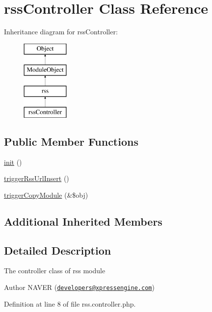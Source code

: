 \hypertarget{classrssController}{}\section{rss\+Controller Class Reference}
\label{classrssController}
Inheritance diagram for rss\+Controller\+:\begin{figure}[H]
\begin{center}
\leavevmode
\includegraphics[height=4.000000cm]{classrssController}
\end{center}
\end{figure}
\subsection*{Public Member Functions}
\begin{DoxyCompactItemize}
\item 
\hyperlink{classrssController_ab492c2ecc29016a37dcb049f318a176b}{init} ()
\item 
\hyperlink{classrssController_a95c7672a5f1e362b368bec030577f33e}{trigger\+Rss\+Url\+Insert} ()
\item 
\hyperlink{classrssController_a4c6d4fe22c2f2abeabe6a1231a63fa8b}{trigger\+Copy\+Module} (\&\$obj)
\end{DoxyCompactItemize}
\subsection*{Additional Inherited Members}


\subsection{Detailed Description}
The controller class of rss module

\begin{DoxyAuthor}{Author}
N\+A\+V\+ER (\href{mailto:developers@xpressengine.com}{\tt developers@xpressengine.\+com}) 
\end{DoxyAuthor}


Definition at line 8 of file rss.\+controller.\+php.



